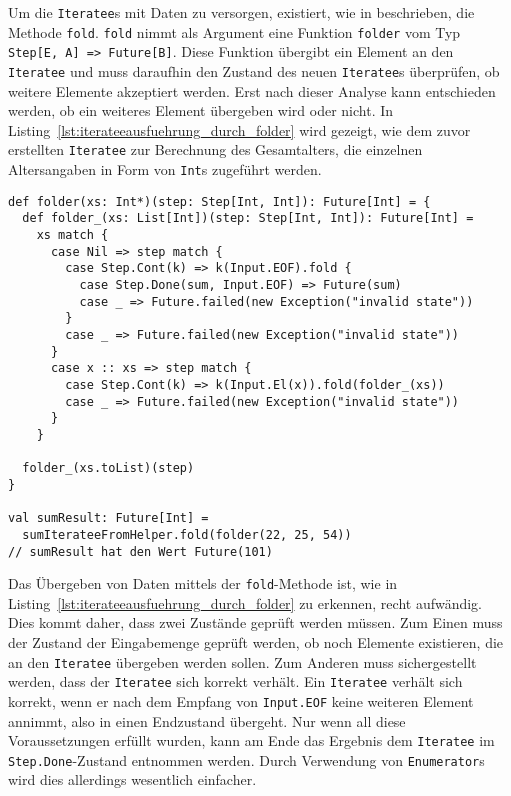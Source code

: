 Um die \lstinline|Iteratee|s mit Daten zu versorgen, existiert, wie in  beschrieben, die Methode \lstinline|fold|.
\lstinline|fold| nimmt als Argument eine Funktion \lstinline|folder| vom Typ \lstinline[breaklines=true]|Step[E, A] => Future[B]|.
Diese Funktion übergibt ein Element an den \lstinline|Iteratee| und muss daraufhin den Zustand des neuen \lstinline|Iteratee|s überprüfen, ob weitere Elemente akzeptiert werden.
Erst nach dieser Analyse kann entschieden werden, ob ein weiteres Element übergeben wird oder nicht.
In Listing~\ref{lst:iterateeausfuehrung_durch_folder} wird gezeigt, wie dem zuvor erstellten \lstinline|Iteratee| zur Berechnung des Gesamtalters, die einzelnen Altersangaben in Form von \lstinline|Int|s zugeführt werden.

\begin{lstlisting}[caption=Ausführung eines Iteratees durch folder-Funktion, label=lst:iterateeausfuehrung_durch_folder]
def folder(xs: Int*)(step: Step[Int, Int]): Future[Int] = {
  def folder_(xs: List[Int])(step: Step[Int, Int]): Future[Int] =
    xs match {
      case Nil => step match {
        case Step.Cont(k) => k(Input.EOF).fold {
          case Step.Done(sum, Input.EOF) => Future(sum)
          case _ => Future.failed(new Exception("invalid state"))
        }
        case _ => Future.failed(new Exception("invalid state"))
      }
      case x :: xs => step match {
        case Step.Cont(k) => k(Input.El(x)).fold(folder_(xs))
        case _ => Future.failed(new Exception("invalid state"))
      }
    }

  folder_(xs.toList)(step)
}

val sumResult: Future[Int] =
  sumIterateeFromHelper.fold(folder(22, 25, 54))
// sumResult hat den Wert Future(101)
\end{lstlisting}

Das Übergeben von Daten mittels der \lstinline|fold|-Methode ist, wie in Listing~\ref{lst:iterateeausfuehrung_durch_folder} zu erkennen, recht aufwändig.
Dies kommt daher, dass zwei Zustände geprüft werden müssen.
Zum Einen muss der Zustand der Eingabemenge geprüft werden, ob noch Elemente existieren, die an den \lstinline|Iteratee| übergeben werden sollen.
Zum Anderen muss sichergestellt werden, dass der \lstinline|Iteratee| sich korrekt verhält.
Ein \lstinline|Iteratee| verhält sich korrekt, wenn er nach dem Empfang von \lstinline|Input.EOF| keine weiteren Element annimmt, also in einen Endzustand übergeht.
Nur wenn all diese Voraussetzungen erfüllt wurden, kann am Ende das Ergebnis dem \lstinline|Iteratee| im \lstinline|Step.Done|-Zustand entnommen werden.
Durch Verwendung von \lstinline|Enumerator|s wird dies allerdings wesentlich einfacher.

